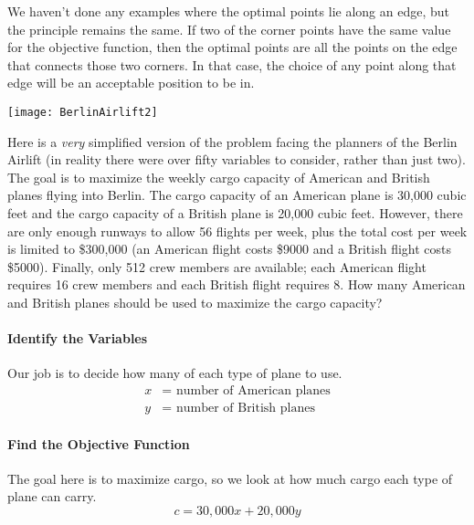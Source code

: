We haven't done any examples where the optimal points lie along an edge, but the principle remains the same.  If two of the corner points have the same value for the objective function, then the optimal points are all the points on the edge that connects those two corners.  In that case, the choice of any point along that edge will be an acceptable position to be in.
\vfill
\pagebreak

\begin{center}
\texttt{[image: BerlinAirlift2]}
\end{center}

\begin{tcolorbox}[sharp corners=all]
 Here is a \emph{very} simplified version of the problem facing the planners of the Berlin Airlift (in reality there were over fifty variables to consider, rather than just two).\\

The goal is to maximize the weekly cargo capacity of American and British planes flying into Berlin.  The cargo capacity of an American plane is 30,000 cubic feet and the cargo capacity of a British plane is 20,000 cubic feet.  However, there are only enough runways to allow 56 flights per week, plus the total cost per week is limited to \$300,000 (an American flight costs \$9000 and a British flight costs \$5000).  Finally, only 512 crew members are available; each American flight requires 16 crew members and each British flight requires 8.  How many American and British planes should be used to maximize the cargo capacity?
\end{tcolorbox}

\paragraph{Identify the Variables} Our job is to decide how many of each type of plane to use.
\begin{align*}
x &= \textrm{ number of American planes}\\
y &= \textrm{ number of British planes}
\end{align*}

\paragraph{Find the Objective Function} The goal here is to maximize cargo, so we look at how much cargo each type of plane can carry.
\[c=30,000x+20,000y\]

